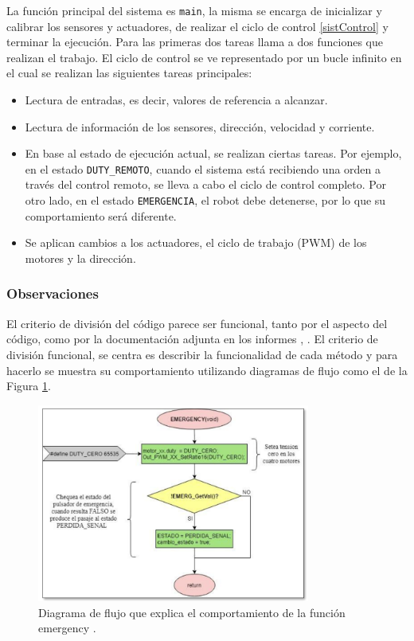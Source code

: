 La función principal del sistema es \verb|main|, la misma se encarga de inicializar y calibrar los sensores y actuadores, de realizar el ciclo de control \ref{sistControl} y terminar la ejecución. Para las primeras dos tareas llama a dos funciones que realizan el trabajo. El ciclo de control se ve representado por un bucle infinito en el cual se realizan las siguientes tareas principales:
\begin{itemize}
\item Lectura de entradas, es decir, valores de referencia a alcanzar.
\item Lectura de información de los sensores, dirección, velocidad y corriente.
\item En base al estado de ejecución actual, se realizan ciertas tareas. Por ejemplo, en el estado \verb|DUTY_REMOTO|, cuando el sistema está recibiendo una orden a través del control remoto, se lleva a cabo el ciclo de control completo. Por otro lado, en el estado \verb|EMERGENCIA|, el robot debe detenerse, por lo que su comportamiento será diferente.
\item Se aplican cambios a los actuadores, el ciclo de trabajo (\gls{PWM}) de los motores y la dirección.
\end{itemize}

\subsubsection*{Observaciones}
El criterio de división del código parece ser funcional, tanto por el aspecto del código, como por la documentación adjunta en los informes \cite[pág. 78-85]{disenioViejo1}, \cite[pág. 110-149]{disenioViejo2}. El criterio de división funcional, se centra es describir la funcionalidad de cada método y para hacerlo se muestra su comportamiento utilizando diagramas de flujo como el de la Figura \ref{diagra}. 

\begin{figure}[h]
\caption{Diagrama de flujo que explica el comportamiento de la función emergency \cite[pág. 82]{disenioViejo1}.}
\label{diagra}
\begin{centering}
{\includegraphics[width=0.8\textwidth]{diagramaFlujo.png}\par}
\end{centering}
\end{figure}


